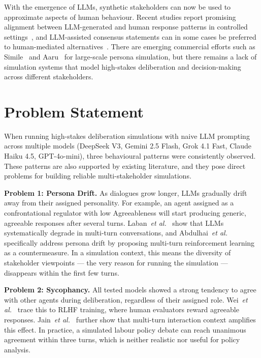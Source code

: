 \documentclass[12pt, a4paper]{report}
\newcommand{\etal}{\textit{et al.}}
\begin{document}
With the emergence of LLMs, synthetic stakeholders can now be used to approximate aspects of human behaviour. Recent studies report promising alignment between LLM-generated and human response patterns in controlled settings~\cite{park2024generative}, and LLM-assisted consensus statements can in some cases be preferred to human-mediated alternatives~\cite{bakker2024habermas}. There are emerging commercial efforts such as Simile~\cite{simile2025} and Aaru~\cite{aaru2025} for large-scale persona simulation, but there remains a lack of simulation systems that model high-stakes deliberation and decision-making across different stakeholders.


\section{Problem Statement}

When running high-stakes deliberation simulations with naive LLM prompting across multiple models (DeepSeek V3, Gemini 2.5 Flash, Grok 4.1 Fast, Claude Haiku 4.5, GPT-4o-mini), three behavioural patterns were consistently observed. These patterns are also supported by existing literature, and they pose direct problems for building reliable multi-stakeholder simulations.

\textbf{Problem 1: Persona Drift.} As dialogues grow longer, LLMs gradually drift away from their assigned personality. For example, an agent assigned as a confrontational regulator with low Agreeableness will start producing generic, agreeable responses after several turns. Laban~\etal~\cite{laban2025lost} show that LLMs systematically degrade in multi-turn conversations, and Abdulhai~\etal~\cite{abdulhai2025} specifically address persona drift by proposing multi-turn reinforcement learning as a countermeasure. In a simulation context, this means the diversity of stakeholder viewpoints --- the very reason for running the simulation --- disappears within the first few turns.

\textbf{Problem 2: Sycophancy.} All tested models showed a strong tendency to agree with other agents during deliberation, regardless of their assigned role. Wei~\etal~\cite{wei2024sycophancy} trace this to RLHF training, where human evaluators reward agreeable responses. Jain~\etal~\cite{jain2026sycophancy} further show that multi-turn interaction context amplifies this effect. In practice, a simulated labour policy debate can reach unanimous agreement within three turns, which is neither realistic nor useful for policy analysis.
\end{document}
